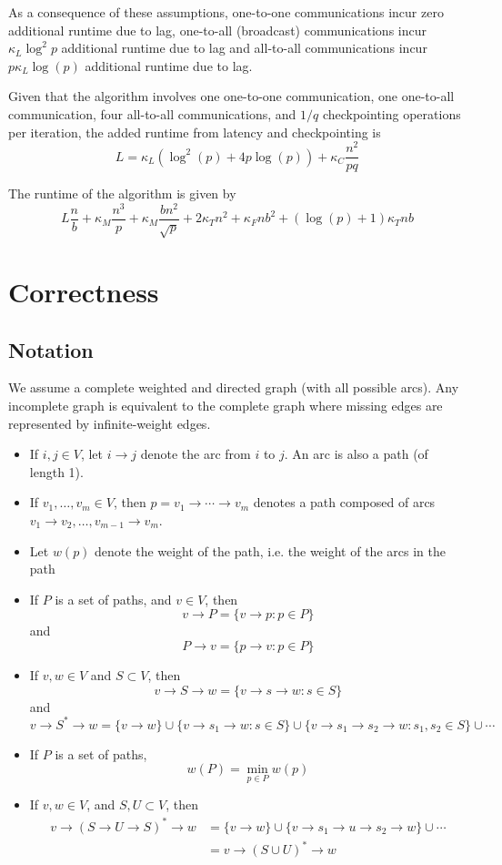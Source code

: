 \documentclass{article} %
\begin{document}
As a consequence of these assumptions, one-to-one communications incur
zero additional runtime due to lag, one-to-all (broadcast)
communications incur $\kappa_L \log^2 p$ additional runtime due to
lag and all-to-all communications incur $p \kappa_L \log(p)$ additional
runtime due to lag.

Given that the algorithm involves one one-to-one communication, one
one-to-all communication, four all-to-all communications, and $1/q$
checkpointing operations per iteration, the added runtime from latency
and checkpointing is
\[
L = \kappa_L(\log^2(p) + 4p\log(p)) + \kappa_C \frac{n^2}{pq}
\]

The runtime of the algorithm is given by
\[
L\frac{n}{b} + \kappa_M \frac{n^3}{p} + \kappa_M \frac{bn^2}{\sqrt{p}} + 2\kappa_T n^2 + \kappa_F nb^2 + (\log(p) + 1)\kappa_T nb
\]


\section{Correctness}

\subsection{Notation}

We assume a complete weighted and directed graph (with all possible
arcs).  Any incomplete graph is equivalent to the complete graph
where missing edges are represented by infinite-weight edges.

\begin{itemize}
\item If $i, j \in V$, let $i \to j$ denote the arc from $i$ to $j$.  An arc is also a path (of length 1).
\item If $v_1, \hdots, v_m \in V$, then $p = v_1\to \cdots \to v_m$  denotes a path composed of arcs $v_1 \to v_2, \hdots, v_{m-1} \to v_m$.
\item Let $w(p)$ denote the weight of the path, i.e. the weight of the arcs in the path
\item If $P$ is a set of paths, and $v \in V$, then
\[
v \to P = \{v \to p: p \in P\}
\]
and
\[
P \to v = \{p \to v: p \in P\}
\]
\item If $v, w \in V$ and $S \subset V$, then
\[ v \to S \to w = \{v \to s \to w: s \in S\}\]
and
\[
v \to S^* \to w = \{v \to w\} \cup \{v \to s_1 \to w: s \in S\} \cup \{v \to s_1 \to s_2 \to w: s_1, s_2 \in S\} \cup \cdots
\]
\item If $P$ is a set of paths,
\[
w(P) = \min_{p \in P} w(p)
\]
\item If $v, w \in V$, and $S, U \subset V$, then
\begin{align*}
v \to (S \to U \to S)^* \to w &= \{v \to w\} \cup \{v \to s_1 \to u \to s_2 \to w\} \cup \cdots\\
&= v \to (S \cup U)^* \to w
\end{align*}
\end{itemize}
\end{document}
